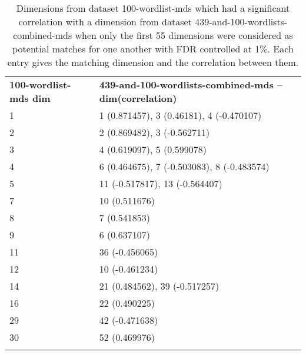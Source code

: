 \begin{longtable}[!htbp]{| ll |}
    \hline
    \textbf{100-wordlist-mds dim} & \textbf{439-and-100-wordlists-combined-mds -- dim(correlation)}\\
    1 & 1 (0.871457), 3 (0.46181), 4 (-0.470107)\\
    2 & 2 (0.869482), 3 (-0.562711)\\
    3 & 4 (0.619097), 5 (0.599078)\\
    4 & 6 (0.464675), 7 (-0.503083), 8 (-0.483574)\\
    5 & 11 (-0.517817), 13 (-0.564407)\\
    7 & 10 (0.511676)\\
    8 & 7 (0.541853)\\
    9 & 6 (0.637107)\\
    11 & 36 (-0.456065)\\
    12 & 10 (-0.461234)\\
    14 & 21 (0.484562), 39 (-0.517257)\\
    16 & 22 (0.490225)\\
    29 & 42 (-0.471638)\\
    30 & 52 (0.469976)\\
    \hline
    \caption{Dimensions from dataset 100-wordlist-mds which had a significant correlation with a dimension from dataset 439-and-100-wordlists-combined-mds when only the first 55 dimensions were considered as potential matches for one another with FDR controlled at 1\%. Each entry gives the matching dimension and the correlation between them.} \label{100-vs-439and100-from-800dim-lowercase-wmt-model-significant-first-55.tex}\\
\end{longtable}
